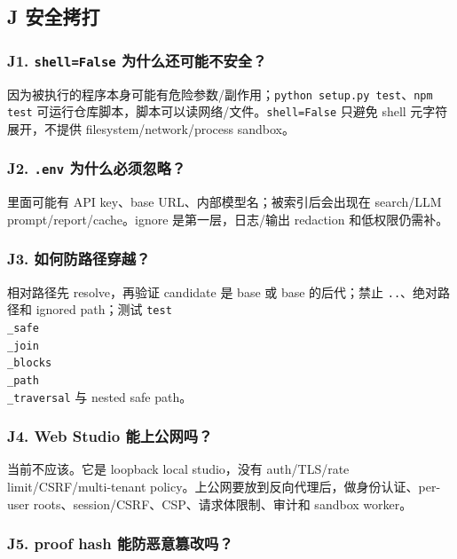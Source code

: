\documentclass[UTF8,12pt,openany]{ctexbook}
\begin{document}
\subsection{J 安全拷打}

\subsubsection{J1. \texttt{shell=False} 为什么还可能不安全？}

因为被执行的程序本身可能有危险参数/副作用；\texttt{python setup.py test}、\texttt{npm test} 可运行仓库脚本，脚本可以读网络/文件。\texttt{shell=False} 只避免 shell 元字符展开，不提供 filesystem/network/process sandbox。\par

\subsubsection{J2. \texttt{.env} 为什么必须忽略？}

里面可能有 API key、base URL、内部模型名；被索引后会出现在 search/LLM prompt/report/cache。ignore 是第一层，日志/输出 redaction 和低权限仍需补。\par

\subsubsection{J3. 如何防路径穿越？}

相对路径先 resolve，再验证 candidate 是 base 或 base 的后代；禁止 \texttt{..}、绝对路径和 ignored path；测试 \texttt{test\\_safe\\_join\\_blocks\\_path\\_traversal} 与 nested safe path。\par

\subsubsection{J4. Web Studio 能上公网吗？}

当前不应该。它是 loopback local studio，没有 auth/TLS/rate limit/CSRF/multi-tenant policy。上公网要放到反向代理后，做身份认证、per-user roots、session/CSRF、CSP、请求体限制、审计和 sandbox worker。\par

\subsubsection{J5. proof hash 能防恶意篡改吗？}
\end{document}
